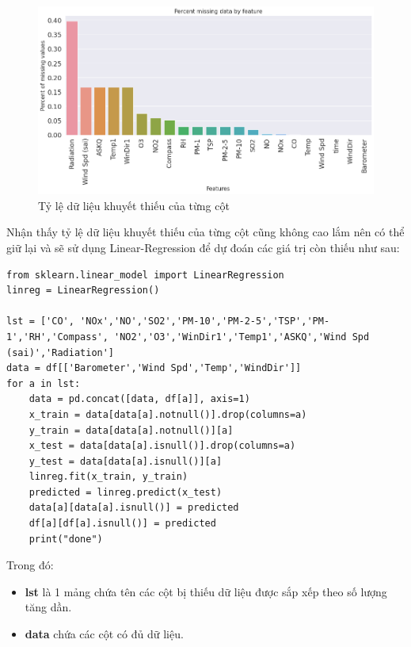 \begin{figure}[H]
    \centering
    \includegraphics[width=.95\textwidth]{figures/missing2.png}
    \caption[Tỷ lệ dữ liệu khuyết thiếu của từng cột]{Tỷ lệ dữ liệu khuyết thiếu của từng cột}
\end{figure}

Nhận thấy tỷ lệ dữ liệu khuyết thiếu của từng cột cũng không cao lắm nên có thể giữ lại và sẽ sử dụng Linear-Regression để dự đoán các giá trị còn thiếu như sau:
\begin{lstlisting}
from sklearn.linear_model import LinearRegression
linreg = LinearRegression()

lst = ['CO', 'NOx','NO','SO2','PM-10','PM-2-5','TSP','PM-1','RH','Compass', 'NO2','O3','WinDir1','Temp1','ASKQ','Wind Spd (sai)','Radiation']
data = df[['Barometer','Wind Spd','Temp','WindDir']]
for a in lst:
    data = pd.concat([data, df[a]], axis=1)
    x_train = data[data[a].notnull()].drop(columns=a)
    y_train = data[data[a].notnull()][a]
    x_test = data[data[a].isnull()].drop(columns=a)
    y_test = data[data[a].isnull()][a]
    linreg.fit(x_train, y_train)
    predicted = linreg.predict(x_test)
    data[a][data[a].isnull()] = predicted
    df[a][df[a].isnull()] = predicted
    print("done")
\end{lstlisting}

\noindent Trong đó:
\begin{itemize}
    \item \textbf{lst} là 1 mảng chứa tên các cột bị thiếu dữ liệu được sắp xếp theo số lượng tăng dần.
    \item \textbf{data} chứa các cột có đủ dữ liệu.
\end{itemize}

